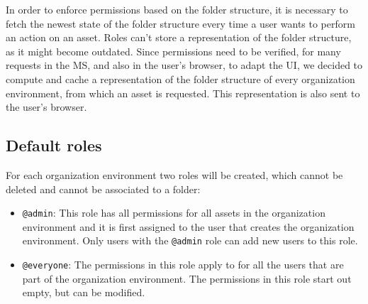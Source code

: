 In order to enforce permissions based on the folder structure, it is necessary to fetch
the newest state of the folder structure every time a user wants to perform an action on an asset.
Roles can't store a representation of the folder structure, as it might become outdated.
Since permissions need to be verified, for many requests in the MS, and also in the user's browser, to
adapt the UI, we decided to compute and cache a representation of the folder structure of
every organization environment, from which an asset is requested.
This representation is also sent to the user's browser.


\subsection{Default roles}

For each organization environment two roles will be created, which cannot be deleted and
cannot be associated to a folder:

\begin{itemize}
  \item \lstinline{@admin}: This role has all permissions for all assets in the
    organization environment and it is first assigned to the user that creates the organization environment.
    Only users with the \lstinline{@admin} role can add new users to this role.
  \item \lstinline{@everyone}: The permissions in this role apply to for all the users
    that are part of the organization environment. The permissions in this role start out
    empty, but can be modified.
\end{itemize}

